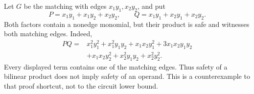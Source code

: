 \begin{example}
Let $G$ be the matching with edges $x_1y_1,x_2y_2$, and put
\[
 P=x_1y_1+x_1y_2+x_2y_2,\qquad
 Q=x_1y_1+x_2y_1+x_2y_2.
\]
Both factors contain a nonedge monomial, but their product is safe
and witnesses both matching edges.  Indeed,
\[
\begin{split}
PQ={}&x_1^2y_1^2+x_1^2y_1y_2+x_1x_2y_1^2
 +3x_1x_2y_1y_2\\
 &+x_1x_2y_2^2+x_2^2y_1y_2+x_2^2y_2^2.
\end{split}
\]
Every displayed term contains one of the matching edges.
Thus safety of a bilinear product does not imply safety of an
operand.  This is a counterexample to that proof shortcut, not to
the circuit lower bound.
\end{example}

